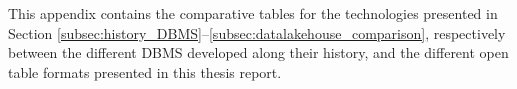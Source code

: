 This appendix contains the comparative tables for the technologies presented in Section \ref{subsec:history_DBMS}--\ref{subsec:datalakehouse_comparison}, respectively between the different \gls{DBMS} developed along their history, and the different open table formats presented in this thesis report.